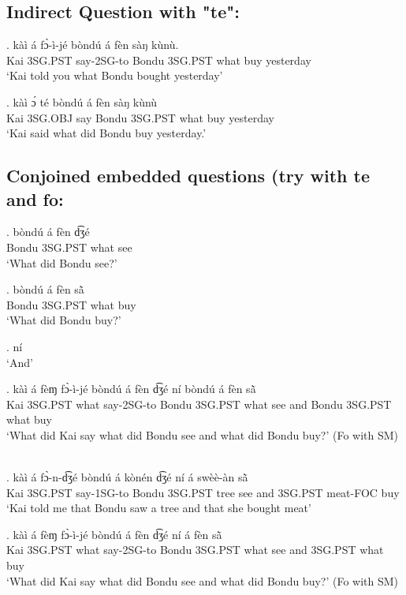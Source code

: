\documentclass{assets/fieldnotes}
\begin{document}
\subsection{Indirect Question with "te":}

\exg. kàì á fɔ̀-ì-jé bòndú á fèn sàŋ kùnù.\\
Kai 3SG.PST say-2SG-to Bondu 3SG.PST what buy yesterday\\
`Kai told you what Bondu bought yesterday' 


\exg. kàì ɔ́ té bòndú á fèn sàŋ kùnù\\
Kai 3SG.OBJ say Bondu 3SG.PST what buy yesterday\\
`Kai said what did Bondu buy yesterday.' 

\subsection{Conjoined embedded questions (try with te and fo:}

\exg. bòndú á fèn d͡ʒé\\
Bondu 3SG.PST what see\\
`What did Bondu see?'

\exg. bòndú á fèn sã̀\\
Bondu 3SG.PST what buy\\
`What did Bondu buy?'

\ex. ní\\
`And'


\exg. kàì á fèɱ fɔ̀-ì-jé bòndú á fèn d͡ʒé ní bòndú á fèn sã̀\\
Kai 3SG.PST what say-2SG-to Bondu 3SG.PST what see and Bondu 3SG.PST what buy\\
`What did Kai say what did Bondu see and what did Bondu buy?' (Fo with SM)

\\

\exg. kàì á fɔ̀-n-d͡ʒé bòndú á kònén d͡ʒé ní á swèè-àn sã̀\\
Kai 3SG.PST say-1SG-to Bondu 3SG.PST tree see and 3SG.PST meat-FOC buy\\
`Kai told me that Bondu saw a tree and that she bought meat'

\exg. kàì á fèɱ fɔ̀-ì-jé bòndú á fèn d͡ʒé ní  á fèn sã̀\\
Kai 3SG.PST what say-2SG-to Bondu 3SG.PST what see and 3SG.PST what buy\\
`What did Kai say what did Bondu see and what did Bondu buy?' (Fo with SM)
\end{document}
